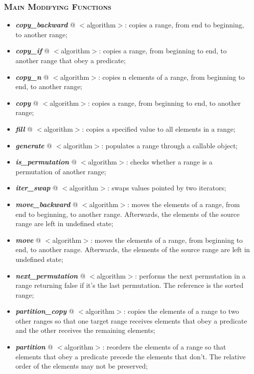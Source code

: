 \documentclass[10pt]{article}
\begin{document}
\begin{multicols*}{5}
{\subsubsection*{\textsc{Main Modifying Functions}} 
\begin{itemize}[leftmargin=*,topsep=0.25pt]
  \setlength\itemsep{-1.8pt}
	\item  \emph{\textbf{copy\_backward}} @ $<$algorithm$>$: copies a range, from end to beginning, to another range;
	\item  \emph{\textbf{copy\_if}} @ $<$algorithm$>$: copies a range, from beginning to end, to another range that obey a predicate;
	\item  \emph{\textbf{copy\_n}} @ $<$algorithm$>$: copies n elements of a range, from beginning to end, to another range;
	\item  \emph{\textbf{copy}} @ $<$algorithm$>$: copies a range, from beginning to end, to another range;
	\item  \emph{\textbf{fill}} @ $<$algorithm$>$: copies a specified value to all elements in a range;
	\item  \emph{\textbf{generate}} @ $<$algorithm$>$: populates a range through a callable object;
	\item  \emph{\textbf{is\_permutation}} @ $<$algorithm$>$: checks whether a range is a permutation of another range;
	\item  \emph{\textbf{iter\_swap}} @ $<$algorithm$>$: swaps values pointed by two iterators;
	\item  \emph{\textbf{move\_backward}} @ $<$algorithm$>$: moves the elements of a range, from end to beginning, to another range. Afterwards, the elements of the source range are left in undefined state;
	\item  \emph{\textbf{move}} @ $<$algorithm$>$: moves the elements of a range, from beginning to end, to another range. Afterwards, the elements of the source range are left in undefined state;
	\item  \emph{\textbf{next\_permutation}} @ $<$algorithm$>$: performs the next permutation in a range returning false if it's the last permutation. The reference is the sorted range;
	\item  \emph{\textbf{partition\_copy}} @ $<$algorithm$>$: copies the elements of a range to two other ranges so that one target range receives elements that obey a predicate and the other receives the remaining elements;
	\item  \emph{\textbf{partition}} @ $<$algorithm$>$: reorders the elements of a range so that elements that obey a predicate precede the elements that don't. The relative order of the elements may not be preserved;

\end{itemize}}
\end{multicols*}
\end{document}

